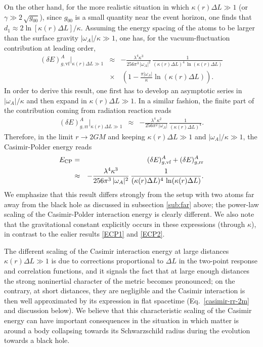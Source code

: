 \documentclass[twocolumn,prd,aps,showpacs,amsmath,amssymb]{revtex4-1}
\def\bea{\begin{eqnarray}}
\def\eea{\end{eqnarray}}
\def\nn{\nonumber}
\begin{document}
On the other hand, for the more realistic situation in which
$\kappa(r) \Delta L \gg 1$ (or $\gamma \gg 2\,\sqrt{g_{00}}$), since
$g_{00}$ is a small quantity near the event horizon, one finds that
$d_1 \approx 2 \ln[\kappa(r) \Delta L]/\kappa$. Assuming the energy
spacing of the atoms to be larger than the surface gravity $|\omega_{A}|/\kappa \gg 1$, one has, for the vacuum-fluctuation contribution at  leading order,
%
\bea
(\delta E)^{A}_{g,\textrm{vf}}\bigg|_{\kappa(r) \Delta L \gg 1} &\approx& -\frac{\lambda^4 \kappa^3}{256\pi^3\,
|\omega_A|^2}\,\frac{1}{(\kappa(r) \Delta L)^4\,\ln(\kappa(r) \Delta L)}
\nn\\
&\times&\,\left(1 -\frac{\pi|\omega_A|}{\kappa} \ln(\kappa(r) \Delta L)\right).
\eea
%
In order to derive this result, one first has to develop an asymptotic series
in $|\omega_{A}|/\kappa$  and then expand  in $\kappa(r) \Delta
L\gg1$. In a similar fashion, the finite part of the contribution
coming from radiation reaction reads 
%
\bea
(\delta E)^{A}_{g,\textrm{rr}}\bigg|_{\kappa(r) \Delta L \gg 1} &\approx& -\frac{\lambda^4\,\kappa^2}{256\pi^2\,|\omega_A|}\,
\frac{1}{(\kappa(r) \Delta L)^4}.
\label{casimir-rr-2m2}
\eea
%
Therefore, in the limit $r \to 2GM$ and keeping  $\kappa(r) \Delta L \gg 1$ and $|\omega_{A}|/\kappa \gg 1$, the Casimir-Polder energy reads%
\bea
E_{\rm CP} &=& (\delta E)^{A}_{g,\textrm{vf}} + (\delta E)^{A}_{g,\textrm{rr}} 
\nn\\
&\approx& -\frac{\lambda^4 \kappa^3}{256\pi^3\,
|\omega_A|^2}\,\frac{1}{(\kappa(r) \Delta L)^4\,\ln(\kappa(r) \Delta L)}. 
\eea
%
We emphasize that this result differs strongly from
the setup with two atoms far away from the black hole as discussed in subsection
\ref{sub:far} above; the power-law scaling of the Casimir-Polder
interaction energy is clearly different. We also note that
the gravitational constant explicitly occurs in
these expressions (through $\kappa$), in contrast to the ealier
results \eqref{ECP1} and \eqref{ECP2}.  

The different scaling of the Casimir interaction energy at large
distances $\kappa(r)\Delta L\gg1$ is due to corrections proportional
to $\Delta L$ in the two-point response and correlation functions, and
it signals the fact that at large enough distances the strong
noninertial character of the metric becomes pronounced; on the
contrary, at short distances, they are negligible and the Casimir
interaction is then well approximated by its expression in flat
spacetime (Eq.~\eqref{casimir-rr-2m} and discussion below). We believe
that this characteristic scaling of the Casimir energy can have
important consequences in the situation in which matter is around a body collapsing
towards its Schwarzschild radius during the evolution towards  a black
hole. 
\end{document}
